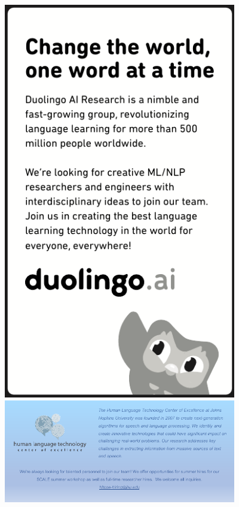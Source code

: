 \begin{center}
  \includegraphics[width=4in]{content/ads/silver/duolingo-emnlp21-quarter-ad.pdf} \\
  \vfill
  \includegraphics[width=4in]{content/ads/silver/emnlp_ad.pdf} \\
  \vfill
\end{center}


